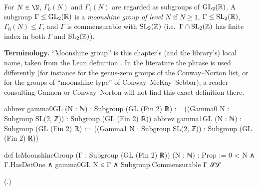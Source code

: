 \begin{definition}\label{ch16:def:moonshinegroup}
For $N\in\N$, $\Gamma_0(N)$ and $\Gamma_1(N)$ are regarded as subgroups of $\mathrm{GL}_2(\mathbb{R})$.  A subgroup
$\Gamma\le\mathrm{GL}_2(\mathbb{R})$ is a \emph{moonshine group of level $N$} if $N\ge1$, $\Gamma\le\mathrm{SL}_2(\mathbb{R})$,
$\Gamma_0(N)\le\Gamma$, and $\Gamma$ is commensurable with $\mathrm{SL}_2(\mathbb{Z})$ (i.e.\ $\Gamma\cap\mathrm{SL}_2(\mathbb{Z})$ has finite
index in both $\Gamma$ and $\mathrm{SL}_2(\mathbb{Z})$).
\end{definition}
\noindent\textbf{Terminology.}  ``Moonshine group'' is this chapter's (and the library's) local name, taken from the Lean
definition .  In the literature the phrase is used differently (for instance for the genus-zero
groups of the Conway--Norton list, or for the groups of ``moonshine type'' of Conway--McKay--Sebbar); a reader
consulting Gannon or Conway--Norton will not find this exact definition there.
\begin{leancode}
abbrev gamma0GL (N : ℕ) : Subgroup (GL (Fin 2) ℝ) := ((Gamma0 N : Subgroup SL(2, ℤ)) : Subgroup (GL (Fin 2) ℝ))
abbrev gamma1GL (N : ℕ) : Subgroup (GL (Fin 2) ℝ) := ((Gamma1 N : Subgroup SL(2, ℤ)) : Subgroup (GL (Fin 2) ℝ))

def IsMoonshineGroup (Γ : Subgroup (GL (Fin 2) ℝ)) (N : ℕ) : Prop :=
  0 < N ∧ Γ.HasDetOne ∧ gamma0GL N ≤ Γ ∧ Subgroup.Commensurable Γ 𝒮ℒ
\end{leancode}
(.)
